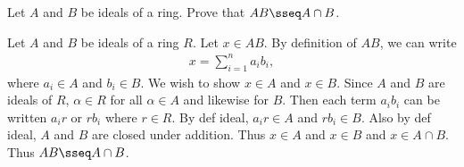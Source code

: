 \documentclass{article}
\begin{document}
Let \( A \) and \( B \) be ideals of a ring. Prove that \( AB\sseq A\cap B \).

\begin{solution} %
  Let \( A \) and \( B \) be ideals of a ring \( R \).
  Let \( x\in AB \).
  By definition of \( AB \), we can write \begin{align*}
    x = \sum_{i=1}^{n}a_ib_i,
  \end{align*} where \( a_i\in A \) and \( b_i\in B \). We wish to show \( x\in A \) and \( x\in B \).
  Since \( A \) and \( B \) are ideals of \( R \), \( \alpha\in R \) for all \( \alpha\in A \) and likewise for \( B \).
  Then each term \( a_ib_i \) can be written \( a_ir \) or \( rb_i \) where \( r\in R \).
  By def ideal, \( a_ir\in A \) and \( rb_i\in B \).
  Also by def ideal, \( A \) and \( B \) are closed under addition.
  Thus \( x\in A \) and \( x\in B \) and \( x\in A\cap B \).
  Thus \( AB\sseq A\cap B \).
\end{solution}
\end{document}

